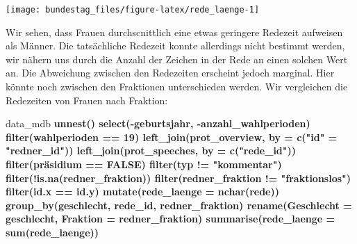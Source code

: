 \documentclass[oneside, 12pt, numbers=endperiod]{scrbook}
\newenvironment{Shaded}{\begin{snugshade}}{\end{snugshade}}
\newcommand{\DataTypeTok}[1]{\textcolor[rgb]{0.13,0.29,0.53}{#1}}
\newcommand{\DecValTok}[1]{\textcolor[rgb]{0.00,0.00,0.81}{#1}}
\newcommand{\KeywordTok}[1]{\textcolor[rgb]{0.13,0.29,0.53}{\textbf{#1}}}
\newcommand{\NormalTok}[1]{#1}
\newcommand{\OperatorTok}[1]{\textcolor[rgb]{0.81,0.36,0.00}{\textbf{#1}}}
\newcommand{\OtherTok}[1]{\textcolor[rgb]{0.56,0.35,0.01}{#1}}
\newcommand{\StringTok}[1]{\textcolor[rgb]{0.31,0.60,0.02}{#1}}
\theoremstyle{definition}
\theoremstyle{definition}
\theoremstyle{definition}
\theoremstyle{remark}
\begin{document}
\begin{center}\texttt{[image: bundestag\_files/figure-latex/rede\_laenge-1]} \end{center}

Wir sehen, dass Frauen durchscnittlich eine etwas geringere Redezeit
aufweisen als Männer. Die tatsächliche Redezeit konnte allerdings nicht
bestimmt werden, wir nähern uns durch die Anzahl der Zeichen in der Rede
an einen solchen Wert an. Die Abweichung zwischen den Redezeiten
erscheint jedoch marginal. Hier könnte noch zwischen den Fraktionen
unterschieden werden. Wir vergleichen die Redezeiten von Frauen nach
Fraktion:

\begin{Shaded}
\begin{Highlighting}[]
\NormalTok{data_mdb }\OperatorTok{%
\StringTok{  }\KeywordTok{unnest}\NormalTok{() }\OperatorTok{%
\StringTok{  }\KeywordTok{select}\NormalTok{(}\OperatorTok{-}\NormalTok{geburtsjahr, }\OperatorTok{-}\NormalTok{anzahl_wahlperioden) }\OperatorTok{%
\StringTok{  }\KeywordTok{filter}\NormalTok{(wahlperioden }\OperatorTok{==}\StringTok{ }\DecValTok{19}\NormalTok{) }\OperatorTok{%
\StringTok{  }\KeywordTok{left_join}\NormalTok{(prot_overview, }\DataTypeTok{by =} \KeywordTok{c}\NormalTok{(}\StringTok{"id"}\NormalTok{ =}\StringTok{ "redner_id"}\NormalTok{)) }\OperatorTok{%
\StringTok{  }\KeywordTok{left_join}\NormalTok{(prot_speeches, }\DataTypeTok{by =} \KeywordTok{c}\NormalTok{(}\StringTok{"rede_id"}\NormalTok{)) }\OperatorTok{%
\StringTok{  }\KeywordTok{filter}\NormalTok{(präsidium }\OperatorTok{==}\StringTok{ }\OtherTok{FALSE}\NormalTok{) }\OperatorTok{%
\StringTok{  }\KeywordTok{filter}\NormalTok{(typ }\OperatorTok{!=}\StringTok{ "kommentar"}\NormalTok{) }\OperatorTok{%
\StringTok{  }\KeywordTok{filter}\NormalTok{(}\OperatorTok{!}\KeywordTok{is.na}\NormalTok{(redner_fraktion)) }\OperatorTok{%
\StringTok{  }\KeywordTok{filter}\NormalTok{(redner_fraktion }\OperatorTok{!=}\StringTok{ "fraktionslos"}\NormalTok{) }\OperatorTok{%
\StringTok{  }\KeywordTok{filter}\NormalTok{(id.x }\OperatorTok{==}\StringTok{ }\NormalTok{id.y) }\OperatorTok{%
\StringTok{  }\KeywordTok{mutate}\NormalTok{(}\DataTypeTok{rede_laenge =} \KeywordTok{nchar}\NormalTok{(rede)) }\OperatorTok{%
\StringTok{  }\KeywordTok{group_by}\NormalTok{(geschlecht, rede_id, redner_fraktion) }\OperatorTok{%
\StringTok{  }\KeywordTok{rename}\NormalTok{(}\DataTypeTok{Geschlecht =}\NormalTok{ geschlecht, }\DataTypeTok{Fraktion =}\NormalTok{ redner_fraktion) }\OperatorTok{%
\StringTok{  }\KeywordTok{summarise}\NormalTok{(}\DataTypeTok{rede_laenge =} \KeywordTok{sum}\NormalTok{(rede_laenge)) }\OperatorTok{%
}}}}}}}}}}}}}}}
\end{Highlighting}
\end{Shaded}
\end{document}

